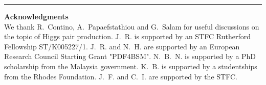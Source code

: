 \bigskip
\bigskip
\begin{center}
\rule{5cm}{.1pt}
\end{center}
\bigskip
\bigskip

{\bf\noindent  Acknowledgments \\}
We thank R.~Contino, A.~Papaefstathiou and
G.~Salam for useful discussions on the topic
of Higgs pair production.
%
J.~R. is supported by an STFC Rutherford Fellowship ST/K005227/1.
%
J.~R. and N.~H. are
supported by an European Research Council Starting Grant "PDF4BSM".
%
N.~B.~N. is supported by a PhD scholarship from the Malaysia
government.
K.~B. is supported by a studentships from the Rhodes Foundation.
%
J.~F. and C.~I. are supported by the STFC.
